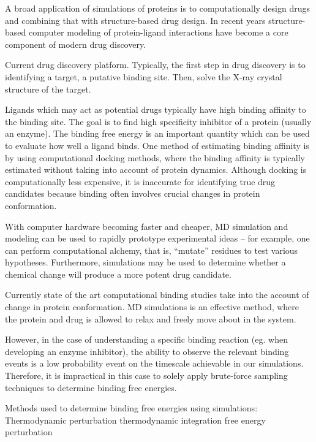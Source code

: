 \begin{outline}

	\1 A broad application of simulations of proteins is to computationally design drugs and combining that with structure-based drug design. In recent years structure-based computer modeling of protein-ligand interactions have become a core component of modern drug discovery. 

	\1 Current drug discovery platform. Typically, the first step in drug discovery is to identifying a target, a putative binding site.  Then, solve the X-ray crystal structure of the target.
	
	\1 Ligands which may act as potential drugs typically have high binding affinity to the binding site. The goal is to find high specificity inhibitor of a protein (usually an enzyme). The binding free energy is an important quantity which can be used to evaluate how well a ligand binds. One method of estimating binding affinity is by using computational docking methods, where the binding affinity is typically estimated without taking into account of protein dynamics.  Although docking is computationally less expensive, it is inaccurate for identifying true drug candidates because binding often involves crucial changes in protein conformation.

	\1 With computer hardware becoming faster and cheaper, MD simulation and modeling can be used to rapidly prototype experimental ideas -- for example, one can perform computational alchemy, that is, ``mutate'' residues to test various hypotheses. Furthermore, simulations may be used to determine whether a chemical change will produce a more potent drug candidate.
	
	\1 Currently state of the art computational binding studies take into the account of change in protein conformation. MD simulations is an effective method, where the protein and drug is allowed to relax and freely move about in the system.

	\1 However, in the case of understanding a specific binding reaction (eg. when developing an enzyme inhibitor), the ability to observe the relevant binding events is a low probability event on the timescale achievable in our simulations. Therefore, it is  impractical in this case to solely apply brute-force sampling techniques to determine binding free energies.

	  \2 Methods used to determine binding free energies using simulations:
	  	\3 Thermodynamic perturbation \cite{Gilson:2007hz}
			\4 thermodynamic integration
			\4 free energy perturbation
\end{outline}

